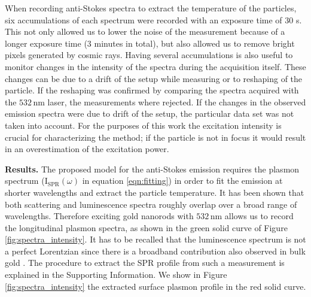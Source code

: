 \documentclass[journal=nalefd,manuscript=letter]{achemso}
\newcommand{\HI}[1]{{#1}} %
\newcommand{\nm}{\ensuremath{\,\textrm{nm}}}
\begin{document}
\HI{When recording anti-Stokes spectra to extract the temperature of the
particles, six accumulations of each spectrum were recorded with an exposure 
time of $30$ s.} This not only allowed us to
lower the noise of the measurement because of a longer exposure time 
\HI{($3$ minutes in total)}, but also allowed us to remove bright pixels generated by cosmic rays. 
Having several accumulations is also useful to monitor changes in the intensity of the spectra
during the acquisition itself. These changes can be due to a drift of the setup
while measuring or to reshaping of the particle. If the reshaping was
confirmed by comparing the spectra acquired with the $532\nm$
laser\cite{Liu2009}, the measurements where rejected. If the changes in the
observed emission spectra were due to drift of the setup, the particular data
set was not taken into account. For the purposes of this work the excitation
intensity is crucial for characterizing the method; if the particle is not in
focus it would result in an overestimation of the excitation power. 


\HI{\textbf{Results.}} The proposed model for the anti-Stokes emission requires the plasmon
spectrum ($\textrm{I}_{\textrm{SPR}}(\omega)$ in equation \ref{eqn:fitting}) 
in order to fit the emission at shorter wavelengths and extract the
particle temperature. It has been shown that both scattering and luminescence
spectra roughly overlap over a broad range of wavelengths\cite{Yorulmaz2012}. Therefore
exciting gold nanorods with $532\nm$ allows us to record the longitudinal
plasmon spectra, as shown in the green solid curve of Figure \ref{fig:spectra_intensity}. 
\HI{It has to be recalled that the luminescence spectrum is not a perfect
Lorentzian since there is a broadband contribution also observed in bulk gold \cite{Mooradian1969}.
The procedure to extract the SPR profile from such a measurement is explained in the
Supporting Information. We show in Figure \ref{fig:spectra_intensity} the extracted 
surface plasmon profile in the red solid curve. }
\end{document}
